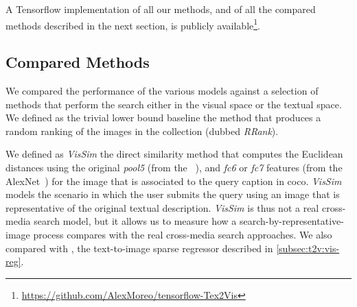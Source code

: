 
A Tensorflow implementation of all our methods, and of all the compared methods described in the next section, is publicly available\footnote{\url{https://github.com/AlexMoreo/tensorflow-Tex2Vis}}.

\subsection{Compared Methods}
\label{subsec:t2v:compared-methods}

We compared the performance of the various \ttv{} models against a selection of methods that perform the search either in the visual space or the textual space.
We defined as the trivial lower bound baseline the method that produces a random ranking of the images in the collection (dubbed \emph{RRank}).

We defined as \emph{VisSim} the direct similarity method that computes the Euclidean distances using the original \emph{pool5} (from the \resnet{}~\cite{he2016deep}), and \emph{fc6} or \emph{fc7} features (from the AlexNet~\cite{zhou2014learning}) for the image that is associated to the query caption in \gls{coco}.
\emph{VisSim} models the scenario in which the user submits the query using an image that is representative of the original textual description.
\emph{VisSim} is thus not a real cross-media search model, but it allows us to measure how a search-by-representative-image process compares with the real cross-media search approaches.
We also compared with \visreg{}, the text-to-image sparse regressor described in \ref{subsec:t2v:vis-reg}.

